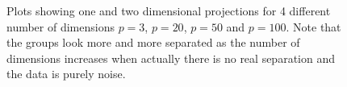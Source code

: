 \begin{figure}[hbtp]
       \caption{Plots showing one and two dimensional projections for 4 different number of dimensions $p=3$, $p=20$, $p=50$ and $p=100$. Note that the groups look more and more separated as the number of dimensions increases when actually there is no real separation and the data is purely noise.  }
       \label{dist_1d}
\end{figure}

